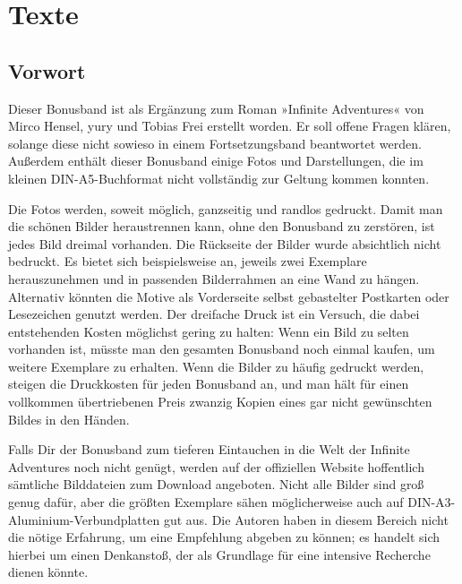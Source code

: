 \maketitle

\tableofcontents

	\newpage

\part{Texte}

\chapter{Vorwort}

Dieser Bonusband ist als Ergänzung zum Roman »Infinite Adventures« von Mirco Hensel, yury und Tobias Frei erstellt worden. Er soll offene Fragen klären, solange diese nicht sowieso in einem Fortsetzungsband beantwortet werden. Außerdem enthält dieser Bonusband einige Fotos und Darstellungen, die im kleinen DIN-A5-Buchformat nicht vollständig zur Geltung kommen konnten.

Die Fotos werden, soweit möglich, ganzseitig und randlos gedruckt. Damit man die schönen Bilder heraustrennen kann, ohne den Bonusband zu zerstören, ist jedes Bild dreimal vorhanden. Die Rückseite der Bilder wurde absichtlich nicht bedruckt. Es bietet sich beispielsweise an, jeweils zwei Exemplare herauszunehmen und in passenden Bilderrahmen an eine Wand zu hängen. Alternativ könnten die Motive als Vorderseite selbst gebastelter Postkarten oder Lesezeichen genutzt werden. Der dreifache Druck ist ein Versuch, die dabei entstehenden Kosten möglichst gering zu halten: Wenn ein Bild zu selten vorhanden ist, müsste man den gesamten Bonusband noch einmal kaufen, um weitere Exemplare zu erhalten. Wenn die Bilder zu häufig gedruckt werden, steigen die Druckkosten für jeden Bonusband an, und man hält für einen vollkommen übertriebenen Preis zwanzig Kopien eines gar nicht gewünschten Bildes in den Händen.

Falls Dir der Bonusband zum tieferen Eintauchen in die Welt der Infinite Adventures noch nicht genügt, werden auf der offiziellen Website hoffentlich sämtliche Bilddateien zum Download angeboten. Nicht alle Bilder sind groß genug dafür, aber die größten Exemplare sähen möglicherweise auch auf DIN-A3-Aluminium-Verbundplatten gut aus. Die Autoren haben in diesem Bereich nicht die nötige Erfahrung, um eine Empfehlung abgeben zu können; es handelt sich hierbei um einen Denkanstoß, der als Grundlage für eine intensive Recherche dienen könnte.

